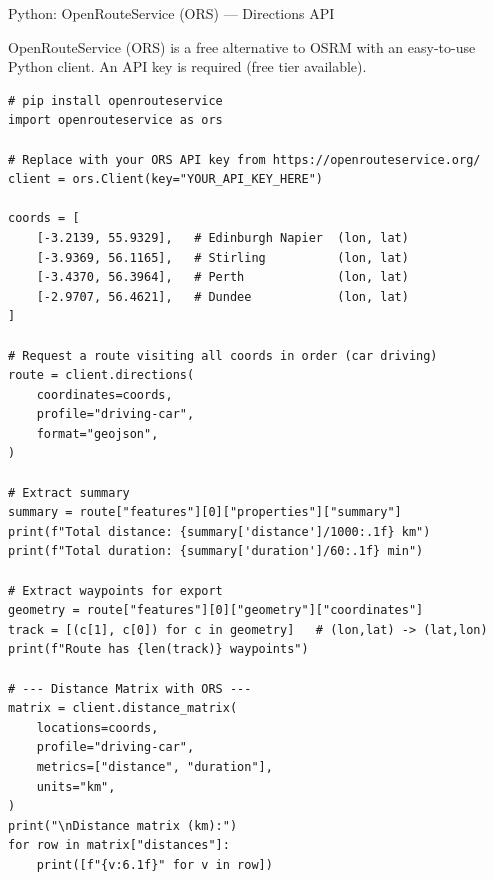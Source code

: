 \documentclass[aspectratio=169,10pt]{beamer}
\begin{document}
\begin{frame}[fragile]{Python: OpenRouteService (ORS) --- Directions API}

  OpenRouteService (ORS) is a free alternative to OSRM with an easy-to-use
  Python client.  An API key is required (free tier available).

\begin{lstlisting}[style=pycode, caption={Routing with OpenRouteService Python client}]
# pip install openrouteservice
import openrouteservice as ors

# Replace with your ORS API key from https://openrouteservice.org/
client = ors.Client(key="YOUR_API_KEY_HERE")

coords = [
    [-3.2139, 55.9329],   # Edinburgh Napier  (lon, lat)
    [-3.9369, 56.1165],   # Stirling          (lon, lat)
    [-3.4370, 56.3964],   # Perth             (lon, lat)
    [-2.9707, 56.4621],   # Dundee            (lon, lat)
]

# Request a route visiting all coords in order (car driving)
route = client.directions(
    coordinates=coords,
    profile="driving-car",
    format="geojson",
)

# Extract summary
summary = route["features"][0]["properties"]["summary"]
print(f"Total distance: {summary['distance']/1000:.1f} km")
print(f"Total duration: {summary['duration']/60:.1f} min")

# Extract waypoints for export
geometry = route["features"][0]["geometry"]["coordinates"]
track = [(c[1], c[0]) for c in geometry]   # (lon,lat) -> (lat,lon)
print(f"Route has {len(track)} waypoints")

# --- Distance Matrix with ORS ---
matrix = client.distance_matrix(
    locations=coords,
    profile="driving-car",
    metrics=["distance", "duration"],
    units="km",
)
print("\nDistance matrix (km):")
for row in matrix["distances"]:
    print([f"{v:6.1f}" for v in row])
\end{lstlisting}

\end{frame}
\end{document}
